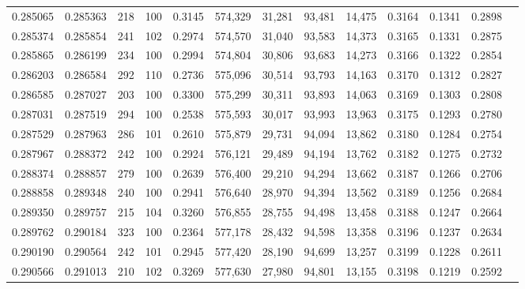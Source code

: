 \begin{tabular}{rrrrrrrrrrrrr}
0.285065 & 0.285363 &   218 & 100 &                                     0.3145 & 574,329 &  31,281 &  93,481 &  14,475 & 0.3164 & 0.1341 & 0.2898 \\
0.285374 & 0.285854 &   241 & 102 &                                     0.2974 & 574,570 &  31,040 &  93,583 &  14,373 & 0.3165 & 0.1331 & 0.2875 \\
0.285865 & 0.286199 &   234 & 100 &                                     0.2994 & 574,804 &  30,806 &  93,683 &  14,273 & 0.3166 & 0.1322 & 0.2854 \\
0.286203 & 0.286584 &   292 & 110 &                                     0.2736 & 575,096 &  30,514 &  93,793 &  14,163 & 0.3170 & 0.1312 & 0.2827 \\
0.286585 & 0.287027 &   203 & 100 &                                     0.3300 & 575,299 &  30,311 &  93,893 &  14,063 & 0.3169 & 0.1303 & 0.2808 \\
0.287031 & 0.287519 &   294 & 100 &                                     0.2538 & 575,593 &  30,017 &  93,993 &  13,963 & 0.3175 & 0.1293 & 0.2780 \\
0.287529 & 0.287963 &   286 & 101 &                                     0.2610 & 575,879 &  29,731 &  94,094 &  13,862 & 0.3180 & 0.1284 & 0.2754 \\
0.287967 & 0.288372 &   242 & 100 &                                     0.2924 & 576,121 &  29,489 &  94,194 &  13,762 & 0.3182 & 0.1275 & 0.2732 \\
0.288374 & 0.288857 &   279 & 100 &                                     0.2639 & 576,400 &  29,210 &  94,294 &  13,662 & 0.3187 & 0.1266 & 0.2706 \\
0.288858 & 0.289348 &   240 & 100 &                                     0.2941 & 576,640 &  28,970 &  94,394 &  13,562 & 0.3189 & 0.1256 & 0.2684 \\
0.289350 & 0.289757 &   215 & 104 &                                     0.3260 & 576,855 &  28,755 &  94,498 &  13,458 & 0.3188 & 0.1247 & 0.2664 \\
0.289762 & 0.290184 &   323 & 100 &                                     0.2364 & 577,178 &  28,432 &  94,598 &  13,358 & 0.3196 & 0.1237 & 0.2634 \\
0.290190 & 0.290564 &   242 & 101 &                                     0.2945 & 577,420 &  28,190 &  94,699 &  13,257 & 0.3199 & 0.1228 & 0.2611 \\
0.290566 & 0.291013 &   210 & 102 &                                     0.3269 & 577,630 &  27,980 &  94,801 &  13,155 & 0.3198 & 0.1219 & 0.2592 \\

\end{tabular}
